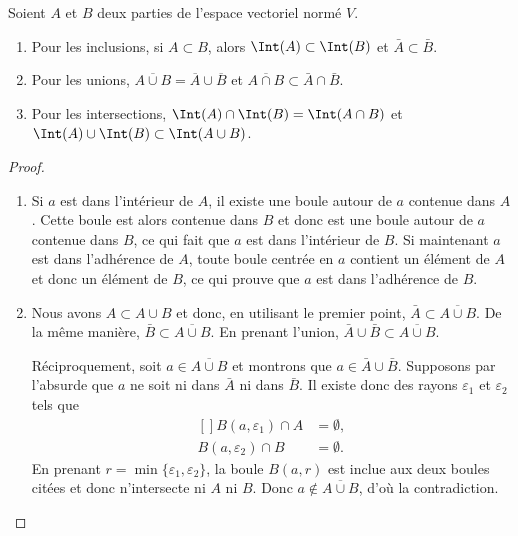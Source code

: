 \begin{proposition}
	Soient \( A\) et \( B\) deux parties de l'espace vectoriel normé \( V\).
	\begin{enumerate}
		\item
		      Pour les inclusions, si \( A\subset B\), alors \( \Int(A)\subset\Int(B)\) et \( \bar A\subset\bar B\).
		\item
		      Pour les unions, \( \overline{ A\cup B }=\overline{ A }\cup\overline{ B }\) et \( \overline{ A\cap B }\subset\bar A\cap\bar B\).
		\item
		      Pour les intersections, \( \Int(A)\cap\Int(B)=\Int(A\cap B)\) et \( \Int(A)\cup\Int(B)\subset\Int(A\cup B)\).
	\end{enumerate}
\end{proposition}

\begin{proof}
	\begin{enumerate}
		\item
		      Si \( a\) est dans l'intérieur de \( A\), il existe une boule autour de \( a\) contenue dans \( A\). Cette boule est alors contenue dans \( B\) et donc est une boule autour de \( a\) contenue dans \( B\), ce qui fait que \( a\) est dans l'intérieur de \( B\). Si maintenant \( a\) est dans l'adhérence de \( A\), toute boule centrée en \( a\) contient un élément de \( A\) et donc un élément de \( B\), ce qui prouve que \( a\) est dans l'adhérence de \( B\).
		\item
		      Nous avons \( A\subset A\cup B\) et donc, en utilisant le premier point, \( \bar A\subset\overline{ A\cup B }\). De la même manière, \( \bar B\subset\overline{ A\cup B }\). En prenant l'union, \( \bar A\cup\bar B\subset\overline{ A\cup B }\).

		      Réciproquement, soit \( a\in\overline{ A\cup B }\) et montrons que \( a\in\bar A\cup\bar B\). Supposons par l'absurde que \( a\) ne soit ni dans \( \bar A\) ni dans \( \bar B\). Il existe donc des rayons \( \varepsilon_1\) et \( \varepsilon_2\) tels que
		      \begin{equation}
			      \begin{aligned}[]
				      B(a,\varepsilon_1)\cap A & =\emptyset, \\
				      B(a,\varepsilon_2)\cap B & =\emptyset.
			      \end{aligned}
		      \end{equation}
		      En prenant \( r=\min\{ \varepsilon_1,\varepsilon_2 \}\), la boule \( B(a,r)\) est inclue aux deux boules citées et donc n'intersecte ni \( A\) ni \( B\). Donc \( a\notin\overline{ A\cup B }\), d'où la contradiction.


\end{enumerate}
\end{proof}
